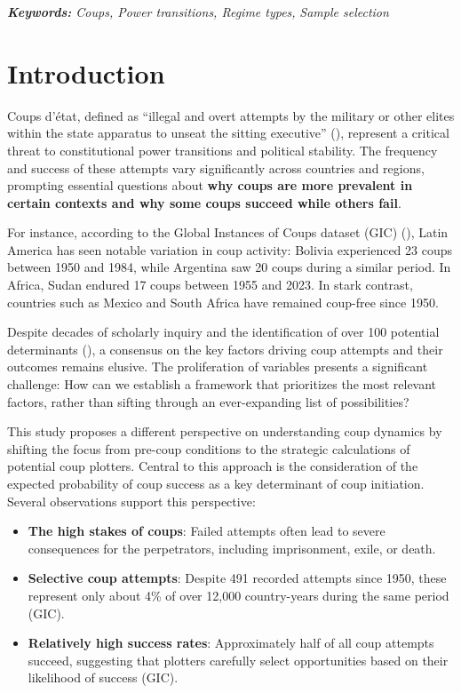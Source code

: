 \documentclass[
  12pt,
]{report}
\begin{document}
\emph{\textbf{Keywords:} Coups, Power transitions, Regime types,}
\emph{Sample selection}

\newpage

\section{Introduction}\label{introduction-1}

Coups d'état, defined as ``illegal and overt attempts by the military or
other elites within the state apparatus to unseat the sitting
executive'' (),
represent a critical threat to constitutional power transitions and
political stability. The frequency and success of these attempts vary
significantly across countries and regions, prompting essential
questions about \textbf{why coups are more prevalent in certain contexts
and why some coups succeed while others fail}.

For instance, according to the Global Instances of Coups dataset (GIC)
(), Latin America
has seen notable variation in coup activity: Bolivia experienced 23
coups between 1950 and 1984, while Argentina saw 20 coups during a
similar period. In Africa, Sudan endured 17 coups between 1955 and 2023.
In stark contrast, countries such as Mexico and South Africa have
remained coup-free since 1950.

Despite decades of scholarly inquiry and the identification of over 100
potential determinants (), a consensus on the key factors driving coup attempts
and their outcomes remains elusive. The proliferation of variables
presents a significant challenge: How can we establish a framework that
prioritizes the most relevant factors, rather than sifting through an
ever-expanding list of possibilities?

This study proposes a different perspective on understanding coup
dynamics by shifting the focus from pre-coup conditions to the strategic
calculations of potential coup plotters. Central to this approach is the
consideration of the expected probability of coup success as a key
determinant of coup initiation. Several observations support this
perspective:

\begin{itemize}
\item
  \textbf{The high stakes of coups}: Failed attempts often lead to
  severe consequences for the perpetrators, including imprisonment,
  exile, or death.
\item
  \textbf{Selective coup attempts}: Despite 491 recorded attempts since
  1950, these represent only about 4\% of over 12,000 country-years
  during the same period (GIC).
\item
  \textbf{Relatively high success rates}: Approximately half of all coup
  attempts succeed, suggesting that plotters carefully select
  opportunities based on their likelihood of success (GIC).
\end{itemize}
\end{document}
